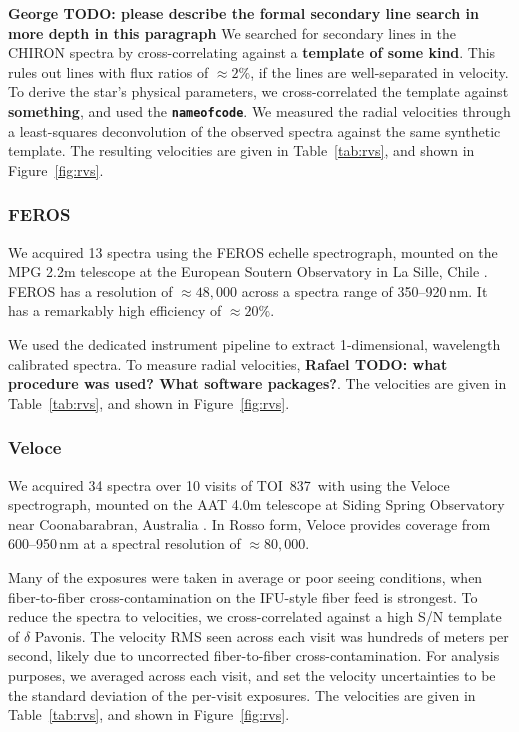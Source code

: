 \documentclass[12pt,twocolumn,tighten]{aastex63}
\newcommand{\tn}{TOI~837} %
\begin{document}
{\bf George TODO: please describe the formal secondary line search in
more depth in this paragraph} We searched for secondary lines in the
CHIRON spectra by cross-correlating against a {\bf template of some
kind}.  This rules out lines with flux ratios of $\approx 2\%$, if the
lines are well-separated in velocity.  To derive the star's physical
parameters, we cross-correlated the template against {\bf something},
and used the {\bf \texttt{nameofcode}}.  We measured the radial
velocities through a least-squares deconvolution of the observed
spectra against the same synthetic template.  The resulting velocities
are given in Table~\ref{tab:rvs}, and shown in Figure~\ref{fig:rvs}.


\subsubsection{FEROS}
We acquired 13 spectra using the FEROS echelle spectrograph, mounted
on the MPG 2.2m telescope at the European Soutern Observatory in La
Sille, Chile \citep{kaufer_commissioning_1999}.  FEROS has a
resolution of $\approx 48{,}000$ across a spectra range of
350--920$\,$nm. It has a remarkably high efficiency of $\approx 20\%$.

We used the dedicated instrument pipeline to extract 1-dimensional,
wavelength calibrated spectra.  To measure radial velocities, {\bf
Rafael TODO: what procedure was used?  What software packages?}.  The
velocities are given in Table~\ref{tab:rvs}, and shown in
Figure~\ref{fig:rvs}.



\subsubsection{Veloce}
We acquired 34 spectra over 10 visits of \tn\ with using the Veloce
spectrograph, mounted on the AAT 4.0m telescope at Siding Spring
Observatory near Coonabarabran, Australia \citep{gilbert_veloce_2018}.
In Rosso form, Veloce provides coverage from 600--950$\,$nm at a
spectral resolution of $\approx 80{,}000$.

Many of the exposures were taken in average or poor seeing conditions,
when fiber-to-fiber cross-contamination on the IFU-style fiber feed is
strongest.  To reduce the spectra to velocities, we cross-correlated
against a high S/N template of $\delta$ Pavonis.  The velocity RMS
seen across each visit was hundreds of meters per second, likely due to
uncorrected fiber-to-fiber cross-contamination.  For
analysis purposes, we averaged across each visit, and set the velocity
uncertainties to be the standard deviation of the per-visit exposures.
The velocities are given in Table~\ref{tab:rvs}, and shown in
Figure~\ref{fig:rvs}.
\end{document}
